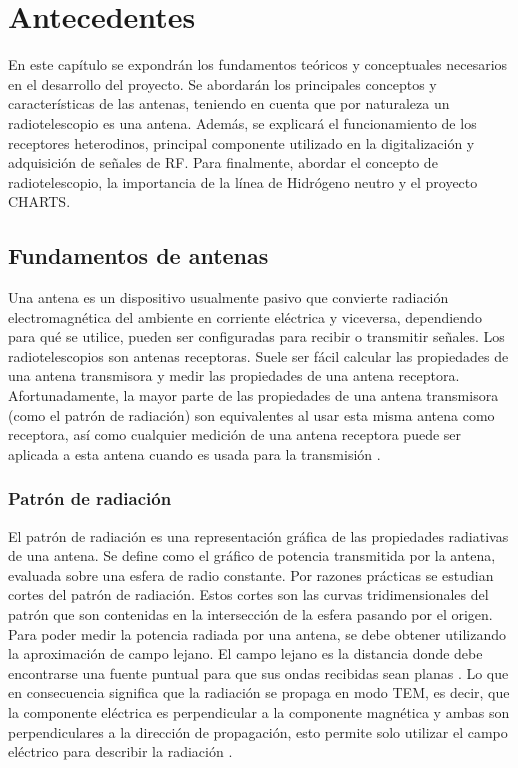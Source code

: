 \chapter{Antecedentes}

En este capítulo se expondrán los fundamentos teóricos y conceptuales necesarios en el desarrollo del proyecto. Se abordarán los principales conceptos y características de las antenas, teniendo en cuenta que por naturaleza un radiotelescopio es una antena. Además, se explicará el funcionamiento de los receptores heterodinos, principal componente utilizado en la digitalización y adquisición de señales de RF. Para finalmente, abordar el concepto de radiotelescopio, la importancia de la línea de Hidrógeno neutro y el proyecto CHARTS.\\

\section{Fundamentos de antenas}

Una antena es un dispositivo usualmente pasivo que convierte radiación electromagnética del ambiente en corriente eléctrica y viceversa, dependiendo para qué se utilice, pueden ser configuradas para recibir o transmitir señales. Los radiotelescopios son antenas receptoras. Suele ser fácil calcular las propiedades de una antena transmisora y medir las propiedades de una antena receptora. Afortunadamente, la mayor parte de las propiedades de una antena transmisora (como el patrón de radiación) son equivalentes al usar esta misma antena como receptora, así como cualquier medición de una antena receptora puede ser aplicada a esta antena cuando es usada para la transmisión \cite{Ransom2016}.\\

\subsection{Patrón de radiación}

El patrón de radiación es una representación gráfica de las propiedades radiativas de una antena. Se define como el gráfico de potencia transmitida por la antena, evaluada sobre una esfera de radio constante. Por razones prácticas se estudian cortes del patrón de radiación. Estos cortes son las curvas tridimensionales del patrón que son contenidas en la intersección de la esfera pasando por el origen.\\

Para poder medir la potencia radiada por una antena, se debe obtener utilizando la aproximación de campo lejano. El campo lejano es la distancia donde debe encontrarse una fuente puntual para que sus ondas recibidas sean planas \cite{Ransom2016}. Lo que en consecuencia significa que la radiación se propaga en modo TEM, es decir, que la componente eléctrica es perpendicular a la componente magnética y ambas son perpendiculares a la dirección de propagación, esto permite solo utilizar el campo eléctrico para describir la radiación \cite{Astudillo2014}.\\

